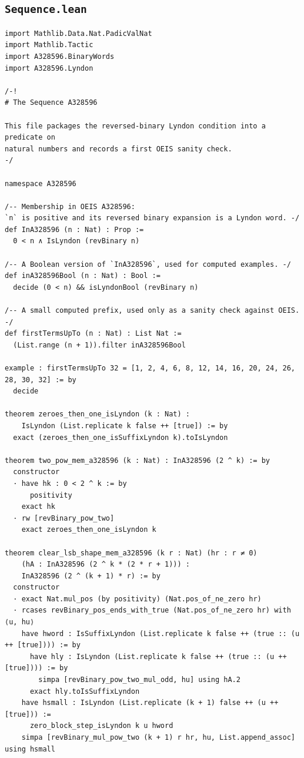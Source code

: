 \documentclass[11pt]{article}
\theoremstyle{definition}
\theoremstyle{remark}
\begin{document}
\subsection{\texttt{Sequence.lean}}
\begin{lstlisting}
import Mathlib.Data.Nat.PadicValNat
import Mathlib.Tactic
import A328596.BinaryWords
import A328596.Lyndon

/-!
# The Sequence A328596

This file packages the reversed-binary Lyndon condition into a predicate on
natural numbers and records a first OEIS sanity check.
-/

namespace A328596

/-- Membership in OEIS A328596:
`n` is positive and its reversed binary expansion is a Lyndon word. -/
def InA328596 (n : Nat) : Prop :=
  0 < n ∧ IsLyndon (revBinary n)

/-- A Boolean version of `InA328596`, used for computed examples. -/
def inA328596Bool (n : Nat) : Bool :=
  decide (0 < n) && isLyndonBool (revBinary n)

/-- A small computed prefix, used only as a sanity check against OEIS. -/
def firstTermsUpTo (n : Nat) : List Nat :=
  (List.range (n + 1)).filter inA328596Bool

example : firstTermsUpTo 32 = [1, 2, 4, 6, 8, 12, 14, 16, 20, 24, 26, 28, 30, 32] := by
  decide

theorem zeroes_then_one_isLyndon (k : Nat) :
    IsLyndon (List.replicate k false ++ [true]) := by
  exact (zeroes_then_one_isSuffixLyndon k).toIsLyndon

theorem two_pow_mem_a328596 (k : Nat) : InA328596 (2 ^ k) := by
  constructor
  · have hk : 0 < 2 ^ k := by
      positivity
    exact hk
  · rw [revBinary_pow_two]
    exact zeroes_then_one_isLyndon k

theorem clear_lsb_shape_mem_a328596 (k r : Nat) (hr : r ≠ 0)
    (hA : InA328596 (2 ^ k * (2 * r + 1))) :
    InA328596 (2 ^ (k + 1) * r) := by
  constructor
  · exact Nat.mul_pos (by positivity) (Nat.pos_of_ne_zero hr)
  · rcases revBinary_pos_ends_with_true (Nat.pos_of_ne_zero hr) with ⟨u, hu⟩
    have hword : IsSuffixLyndon (List.replicate k false ++ (true :: (u ++ [true]))) := by
      have hly : IsLyndon (List.replicate k false ++ (true :: (u ++ [true]))) := by
        simpa [revBinary_pow_two_mul_odd, hu] using hA.2
      exact hly.toIsSuffixLyndon
    have hsmall : IsLyndon (List.replicate (k + 1) false ++ (u ++ [true])) :=
      zero_block_step_isLyndon k u hword
    simpa [revBinary_mul_pow_two (k + 1) r hr, hu, List.append_assoc] using hsmall


\end{lstlisting}
\end{document}
